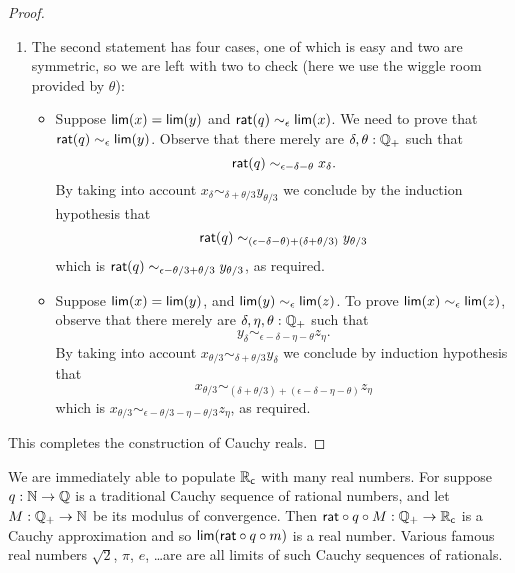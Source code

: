 \begin{proof}
\begin{enumerate}
\begin{itemize}
    \end{itemize}
  \item The second statement has four cases, one of which is easy and two are symmetric,
    so we are left with two to check (here we use the wiggle room provided by $\theta$):
    \begin{itemize}
    \item Suppose $\mathsf{lim}(x) = \mathsf{lim}(y)$ and $\mathsf{rat}(q) \sim_\epsilon \mathsf{lim}(x)$. We need
      to prove that $\mathsf{rat}(q) \sim_\epsilon \mathsf{lim}(y)$. Observe that there merely are
      $\delta, \theta : \mathbb{Q}_{+}$ such that
      \begin{equation*}
        \mathsf{rat}(q) \sim_{\epsilon - \delta - \theta} x_\delta.
      \end{equation*}
      By taking into account $x_\delta \sim_{\delta + \theta/3} y_{\theta/3}$ we conclude
      by the induction hypothesis that      
      \begin{equation*}
        \mathsf{rat}(q) \sim_{(\epsilon - \delta - \theta) + (\delta + \theta/3)} y_{\theta/3}
      \end{equation*}
      which is $\mathsf{rat}(q) \sim_{\epsilon - \theta/3 + \theta/3} y_{\theta/3}$, as required.
    \item Suppose $\mathsf{lim}(x) = \mathsf{lim}(y)$, and $\mathsf{lim}(y) \sim_\epsilon \mathsf{lim}(z)$. To
      prove $\mathsf{lim}(x) \sim_\epsilon \mathsf{lim}(z)$, observe that there merely are $\delta,
      \eta, \theta : \mathbb{Q}_{+}$ such that
      \begin{equation*}
        y_\delta \sim_{\epsilon - \delta - \eta - \theta} z_\eta.
      \end{equation*}
      By taking into account $x_{\theta/3} \sim_{\delta + \theta/3} y_\delta$ we conclude
      by induction hypothesis that
      \begin{equation*}
        x_{\theta/3} \sim_{(\delta + \theta/3) + (\epsilon - \delta - \eta - \theta)} z_\eta
      \end{equation*}
      which is $x_{\theta/3} \sim_{\epsilon - \theta/3 - \eta - \theta/3} z_\eta$, as
      required.
    \end{itemize}
  \end{enumerate}
  This completes the construction of Cauchy reals.
\end{proof}

We are immediately able to populate $\mathbb{R}_\mathsf{c}$ with many real numbers. For suppose $q : \mathbb{N} \to
\mathbb{Q}$ is a traditional Cauchy sequence of rational numbers, and let $M : \mathbb{Q}_{+} \to \mathbb{N}$ be its
modulus of convergence. Then $\mathsf{rat} \circ q \circ M : \mathbb{Q}_{+} \to \mathbb{R}_\mathsf{c}$ is a Cauchy
approximation and so $\mathsf{lim}(\mathsf{rat} \circ q \circ m)$ is a real number. Various famous
real numbers $\sqrt{2}$, $\pi$, $e$, \dots are are all limits of such Cauchy sequences of
rationals.

